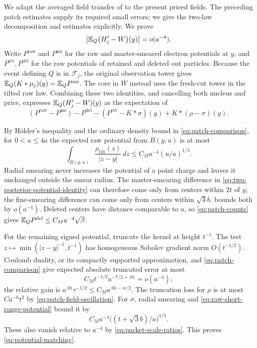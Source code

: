 We adapt the averaged field transfer of
\cite[\FAveragedTransfer]{Foundation} to the present priced fields.
The preceding patch estimates supply its required small errors;
we give the two-law decomposition and estimates explicitly.
We prove
\begin{equation}
 \left|\mathbb E_Q\bigl(H'_j-W\bigr)(y)\right|=o(a^{-4}).
 \label{eq:potential-matching}
\end{equation}
Write $P^{\mathrm{raw}}$ and $P^{\mathrm{ms}}$ for the raw and
master-smeared electron potentials at $y$, and
$P^{\mathrm{ret}},P^{\mathrm{del}}$ for the raw potentials of retained
and deleted out particles.  Because the event defining $Q$ is in
$\mathcal F_j$, the original observation tower gives
$\mathbb E_Q(K*\mu_j)(y)=\mathbb E_QP^{\mathrm{ms}}$.
The core in $W$ instead uses the fresh-cut tower in the tilted raw law.
Combining these two identities, and cancelling both nucleus and price,
expresses $\mathbb E_Q(H'_j-W)(y)$ as the expectation of
\begin{equation}
 (P^{\mathrm{raw}}-P^{\mathrm{ms}})-P^{\mathrm{del}}
    -(P^{\mathrm{ret}}-K*\sigma)(y)+K*(\rho-\sigma)(y).
 \label{eq:two-posterior-potential-identity}
\end{equation}

By H\"older's inequality and the ordinary density bound in
\cref{eq:patch-comparison}, for $0<u\leq4a$ the expected raw potential
from $B(y,u)$ is at most
\begin{equation}
 \int_{B(y,u)}\frac{\rho_{\mathrm{tilt}}(z)}{|z-y|}\,dz
                  \leq C_Ma^{-4}(u/a)^{1/5}.
 \label{eq:raw-short-range-potential}
\end{equation}
Radial smearing never increases the potential of a point charge and
leaves it unchanged outside the smear radius.  The master-smearing
difference in \cref{eq:two-posterior-potential-identity} can therefore
come only from centers within $2t$ of $y$; the fine-smearing difference
can come only from centers within $\sqrt3b$.
 bounds both by $o(a^{-4})$.
Deleted centers have distance comparable to $a$, so
\cref{eq:patch-counts} gives
$\mathbb E_QP^{\mathrm{del}}\leq C_Ma^{-4}\sqrt\beta$.

For the remaining signed potential, truncate the kernel at height $t^{-1}$.
The test $z\mapsto\min(|z-y|^{-1},t^{-1})$ has homogeneous Sobolev gradient
norm $O(t^{-1/2})$.  Coulomb duality, or its compactly supported
approximation, and \cref{eq:patch-comparison} give expected absolute
truncated error at most
\[
 C_Mt^{-1/2}a^{-7/2+.01}=o(a^{-4});
\]
the relative gain is $a^{.01}\tau^{-1/2}\leq C_Ma^{.01-w/2}$.
The truncation loss for $\rho$ is at most $Ca^{-6}t^2$ by
\cref{eq:patch-field-oscillation}.  For $\sigma$, radial smearing and
\cref{eq:raw-short-range-potential} bound it by
\[
 C_Ma^{-4}\bigl((t+\sqrt3b)/a\bigr)^{1/5}.
\]
These also vanish relative to $a^{-4}$ by
\cref{eq:packet-scale-ratios}.  This proves
\cref{eq:potential-matching}.

